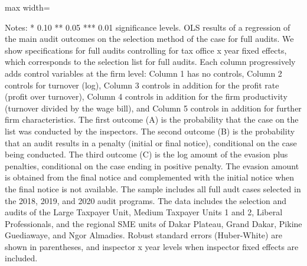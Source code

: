 \documentclass{article}
\newcommand{\OutPath}{Output/}%
\newcommand{\OutPath}{../Output/}%
\begin{document}
\newcommand{\TableEightRobustnessNotes}[1]{%
\footnotesize
\item Notes: * 0.10 ** 0.05 *** 0.01 significance levels. OLS results of a regression of the main audit outcomes on the selection method of the case for full audits. We show specifications for full audits controlling for tax office x year fixed effects, which corresponds to the selection list for full audits. Each column progressively adds control variables at the firm level: Column 1 has no controls, Column 2 controls for turnover (log), Column 3 controls in addition for the profit rate (profit over turnover), Column 4 controls in addition for the firm productivity (turnover divided by the wage bill), and Column 5 controls in addition for further firm characteristics. #1 The first outcome (A) is the probability that the case on the list was conducted by the inspectors. The second outcome (B) is the probability that an audit results in a penalty (initial or final notice), conditional on the case being conducted. The third outcome (C) is the log amount of the evasion plus penalties, conditional on the case ending in positive penalty. The evasion amount is obtained from the final notice and complemented with the initial notice when the final notice is not available. The sample includes all full audt cases selected in the 2018, 2019, and 2020 audit programs. The data includes the selection and audits of the Large Taxpayer Unit, Medium Taxpayer Units 1 and 2, Liberal Professionals, and the regional SME units of Dakar Plateau, Grand Dakar, Pikine Guediawaye, and Ngor Almadies. Robust standard errors (Huber-White) are shown in parentheses, and inspector x year levels when inspector fixed effects are included.
}

\begin{table}[H]\centering
\begin{adjustbox}{max width=\textwidth}
\begin{threeparttable}
\caption{Explaining the Execution Gap for Full Audits: The Role of Observable Characteristics}
\label{tab:table8_fullaudits_replicated}

\footnotesize


\begin{tablenotes}[flushleft]
\TableEightRobustnessNotes{}
\end{tablenotes}
\end{threeparttable}
\end{adjustbox}
\end{table}
\end{document}

